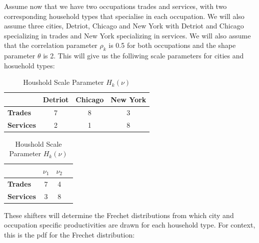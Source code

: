 \documentclass[10pt]{article}
\begin{document}
Assume now that we have two occupations trades and services, with two corresponding household types that specialise in each occupation. We will also assume three cities, Detriot, Chicago and New York with Detriot and Chicago specializing in trades and New York specializing in services. We will also assume that the correlation parameter $\rho_k$ is 0.5 for both occupations and the shape parameter $\theta$ is 2. This will give us the folliwing scale parameters for cities and hosuehold types:

\newpage

\begin{table}[h]
    \begin{minipage}{0.5\textwidth}
        \centering
        \begin{tabular}{|l|c|c|c|}
            \hline
                              & \textbf{Detriot} & \textbf{Chicago} & \textbf{New York} \\
            \hline
            \textbf{Trades}   & 7                & 8                & 3                 \\
            \hline
            \textbf{Services} & 2                & 1                & 8                 \\
            \hline
        \end{tabular}
        \caption{City Scale Parameters $T_{ck}^{\star}$}
        \label{city_shifter}
    \end{minipage}%
    \begin{minipage}{0.5\textwidth}
        \centering
        \begin{tabular}{|l|c|c|c|}
            \hline
                              & \textbf{$\nu_1$} & \textbf{$\nu_2$} \\
            \hline
            \textbf{Trades}   & 7                & 4                \\
            \hline
            \textbf{Services} & 3                & 8                \\
            \hline
        \end{tabular}
        \caption{Houshold Scale Parameter $H_k(\nu)$}
        \label{household_shifter}
    \end{minipage}
\end{table}

These shifters will determine the Frechet distributions from which city and occupation specific productivities are drawn for each household type. For context, this is the pdf for the Frechet distribution:
\end{document}
